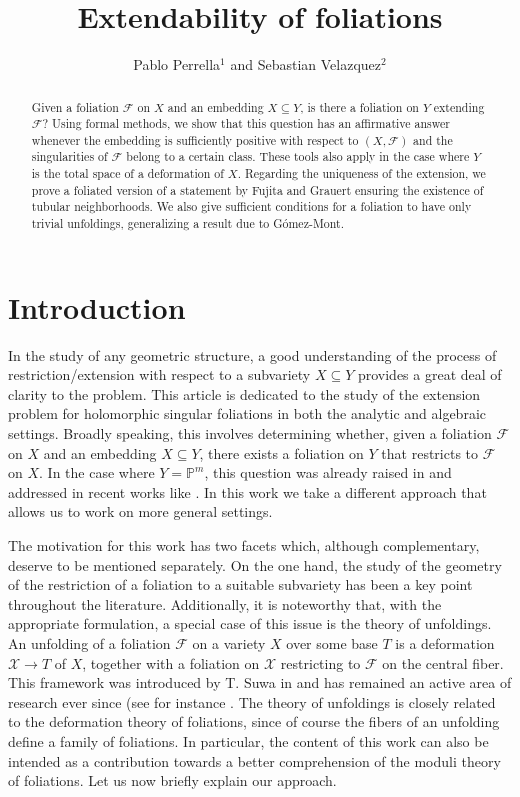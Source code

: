 \documentclass[reqno]{amsart}
\title{Extendability of foliations}
\author{Pablo Perrella$^1$ and Sebastian Velazquez$^2$}
\date{}
\theoremstyle{plain}
\renewcommand\P{\mathbb{P}}
\newcommand{\X}{\mathcal{X}}
\newcommand{\F}{\mathscr{F}}
\theoremstyle{definition}
\theoremstyle{named}
\begin{document}
    


\begin{abstract}
       Given a foliation $\F$ on $X$ and an embedding $X\subseteq Y$, is there a foliation on $Y$ extending $\F$? Using formal methods, we show that this question has an affirmative answer whenever the embedding is sufficiently positive with respect to $(X,\F)$ and the singularities of $\F$ belong to a certain class. These tools also apply in the case where $Y$ is the total space of a deformation of $X$. Regarding the uniqueness of the extension, we prove a foliated version of a statement by Fujita and Grauert ensuring the existence of tubular neighborhoods. We also give sufficient conditions for a foliation to have only trivial unfoldings, generalizing a result due to G\'omez-Mont.
\end{abstract}

\maketitle



\section{Introduction}
In the study of any geometric structure, a good understanding of the process of restriction/extension with respect to a subvariety $X\subseteq Y$ provides a great deal of clarity to the problem. This article is dedicated to the study of the extension problem for holomorphic singular foliations in both the analytic and algebraic settings. Broadly speaking, this involves determining whether, given a foliation $\F$ on $X$ and an embedding $X\subseteq Y$, there exists a foliation on $Y$ that restricts to $\F$ on $X$. In the case where $Y=\P^m$, this question was already raised in \cite[Section 2.1]{cerveau2013quelques} and addressed in recent works like \cite{araujo2018codimension,   figueira2023extensions, benedetti2023codimension}. In this work we take a different approach that allows us to work on more general settings. 

The motivation for this work has two facets which, although complementary, deserve to be mentioned separately. On the one hand, the study of the geometry of the restriction of a foliation to a suitable subvariety has been a key point throughout the literature. Additionally, it is noteworthy that, with the appropriate formulation, a special case of this issue is the theory of unfoldings. An unfolding of a foliation $\F$ on a variety $X$ over some base $T$ is a deformation $\X\to T$ of $X$, together with a foliation on $\X$ restricting to $\F$ on the central fiber. 
This framework was introduced by T. Suwa in \cite{SuwaVersality} and has remained an active area of research ever since (see for instance \cite{gomez1989unfoldings, molinuevo2016unfoldings, persistent2021}. The theory of unfoldings is closely related to the deformation theory of foliations, since of course the fibers of an unfolding define a family of foliations. 
In particular, the content of this work can also be intended as a contribution towards a better comprehension of the moduli theory of foliations.
Let us now briefly explain our approach.
\end{document}

